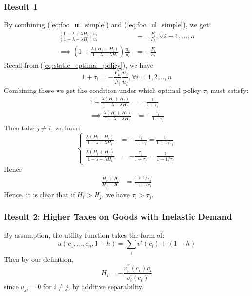 \documentclass[12pt]{article}
\begin{document}
	\subsubsection*{Result 1}
	By combining (\ref{eq:foc_ui_simple}) and (\ref{eq:foc_ul_simple}), we get:
	\begin{align*}
		\frac{(1-\lambda + \lambda H_i)u_i}{(1-\lambda - \lambda H_l)u_l} &= -\frac{F_i}{F_h}, \forall i = 1, ..., n\\
		\implies \left(1 + \frac{\lambda (H_i + H_l)}{1-\lambda - \lambda H_l}\right) \frac{u_i}{u_l} &= -\frac{F_i}{F_h}
	\end{align*}
	Recall from (\ref{eq:static_optimal_policy}), we have
	\begin{equation*}
		1 + \tau_i = -\frac{F_h}{F_i}\frac{u_i}{u_l}, \forall i = 1, 2, .., n
	\end{equation*}
	Combining these we get the condition under which optimal policy $\tau_i$ must satisfy:
	\begin{align*}
		1 + \frac{\lambda (H_i + H_l)}{1-\lambda - \lambda H_l} &= \frac{1}{1 + \tau_i}\\
		\implies \frac{\lambda (H_i + H_l)}{1-\lambda - \lambda H_l} &= -\frac{\tau_i}{1 + \tau_i}
	\end{align*}
	Then take $j \neq i$, we have:
	\[\begin{cases}
		\frac{\lambda (H_i + H_l)}{1-\lambda - \lambda H_l} &= -\frac{\tau_i}{1 + \tau_i} = \frac{1}{1 + 1/\tau_i}\\
		\frac{\lambda (H_j + H_l)}{1-\lambda - \lambda H_l} &= -\frac{\tau_j}{1 + \tau_j} = \frac{1}{1 + 1/\tau_j}
	\end{cases}\]
	Hence
	\begin{align*}
		\frac{H_i + H_l}{H_j + H_l} &= \frac{1+1/\tau_j}{1+1/\tau_i}
	\end{align*}
	Hence, it is clear that if $H_i > H_j$, we have $\tau_i > \tau_j$.
	
	\subsubsection*{Result 2: Higher Taxes on Goods with Inelastic Demand}
	By assumption, the utility function takes the form of:
	\begin{equation*}
		u(c_1, ..., c_n, 1-h) = \sum_{i} v^{i}(c_i) + (1-h)
	\end{equation*}
	Then by our definition,
	\begin{equation*}
		H_i = -\frac{v_i^{''}(c_i) c_i}{v_i^{'}(c_i)}
	\end{equation*}
	since $u_{ji} = 0$ for $i \neq j$, by additive separability.
	
\end{document}
